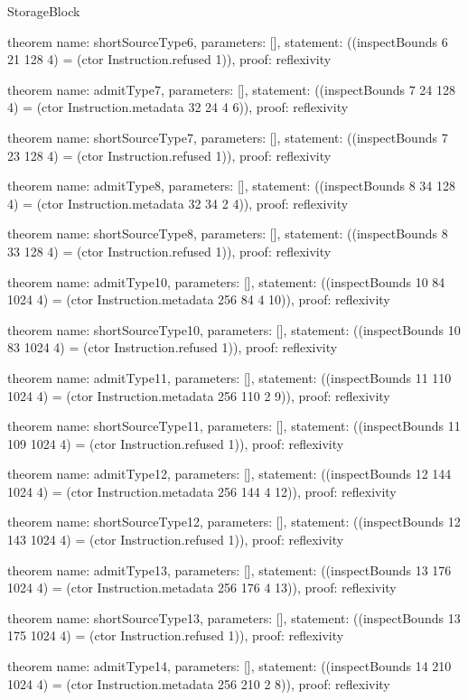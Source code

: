 \begin{lexlean}{StorageBlock}
\begin{semanticmodule}
theorem{
  name: shortSourceType6,
  parameters: [],
  statement: ((inspectBounds 6 21 128 4) = (ctor Instruction.refused 1)),
  proof: reflexivity{}
}

theorem{
  name: admitType7,
  parameters: [],
  statement: ((inspectBounds 7 24 128 4) = (ctor Instruction.metadata 32 24 4 6)),
  proof: reflexivity{}
}

theorem{
  name: shortSourceType7,
  parameters: [],
  statement: ((inspectBounds 7 23 128 4) = (ctor Instruction.refused 1)),
  proof: reflexivity{}
}

theorem{
  name: admitType8,
  parameters: [],
  statement: ((inspectBounds 8 34 128 4) = (ctor Instruction.metadata 32 34 2 4)),
  proof: reflexivity{}
}

theorem{
  name: shortSourceType8,
  parameters: [],
  statement: ((inspectBounds 8 33 128 4) = (ctor Instruction.refused 1)),
  proof: reflexivity{}
}

theorem{
  name: admitType10,
  parameters: [],
  statement: ((inspectBounds 10 84 1024 4) = (ctor Instruction.metadata 256 84 4 10)),
  proof: reflexivity{}
}

theorem{
  name: shortSourceType10,
  parameters: [],
  statement: ((inspectBounds 10 83 1024 4) = (ctor Instruction.refused 1)),
  proof: reflexivity{}
}

theorem{
  name: admitType11,
  parameters: [],
  statement: ((inspectBounds 11 110 1024 4) = (ctor Instruction.metadata 256 110 2 9)),
  proof: reflexivity{}
}

theorem{
  name: shortSourceType11,
  parameters: [],
  statement: ((inspectBounds 11 109 1024 4) = (ctor Instruction.refused 1)),
  proof: reflexivity{}
}

theorem{
  name: admitType12,
  parameters: [],
  statement: ((inspectBounds 12 144 1024 4) = (ctor Instruction.metadata 256 144 4 12)),
  proof: reflexivity{}
}

theorem{
  name: shortSourceType12,
  parameters: [],
  statement: ((inspectBounds 12 143 1024 4) = (ctor Instruction.refused 1)),
  proof: reflexivity{}
}

theorem{
  name: admitType13,
  parameters: [],
  statement: ((inspectBounds 13 176 1024 4) = (ctor Instruction.metadata 256 176 4 13)),
  proof: reflexivity{}
}

theorem{
  name: shortSourceType13,
  parameters: [],
  statement: ((inspectBounds 13 175 1024 4) = (ctor Instruction.refused 1)),
  proof: reflexivity{}
}

theorem{
  name: admitType14,
  parameters: [],
  statement: ((inspectBounds 14 210 1024 4) = (ctor Instruction.metadata 256 210 2 8)),
  proof: reflexivity{}
}


\end{semanticmodule}
\end{lexlean}
